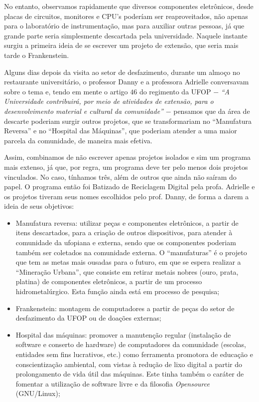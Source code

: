 \documentclass[
	12pt,				%
	openright,			%
	oneside,			%
	a4paper,			%
	english,			%
	spanish,			%
	brazil,				%
	]{abntex2}
\begin{document}
No entanto, observamos rapidamente que diversos componentes eletrônicos, desde placas de circuitos, monitores e CPU's poderíam ser reaproveitados, não apenas para o laboratório de instrumentação, mas para auxiliar outras pessoas, já que grande parte seria simplesmente descartada pela universidade. Naquele instante surgiu a primeira ideia de se escrever um projeto de extensão, que seria mais tarde o Frankenstein.

Alguns dias depois da visita ao setor de desfazimento, durante um almoço no restaurante universitário, o professor Danny e a professora Adrielle conversavam sobre o tema e, tendo em mente o artigo $46$ do regimento da UFOP $-$ \textit{``A Universidade contribuirá, por meio de atividades de extensão, para o desenvolvimento material e cultural da comunidade''} $-$ pensamos que da área de descarte poderiam surgir outros projetos, que se transformariam no ``Manufatura Reversa'' e no ``Hospital das Máquinas'', que poderiam atender a uma maior parcela da comunidade, de maneira mais efetiva.

Assim, combinamos de não escrever apenas projetos isolados e sim um programa mais extenso, já que, por regra, um programa deve ter pelo menos dois projetos vinculados. No caso, tínhamos três, além de outros que ainda não saíram do papel. O programa então foi Batizado de Reciclagem Digital pela profa. Adrielle e  os projetos tiveram seus nomes escolhidos pelo prof. Danny, de forma a darem a ideia de seus objetivos:
\begin{itemize}

	\item Manufatura reversa: utilizar peças e componentes eletrônicos, a partir de itens descartados, para a criação de outros dispositivos, para atender à comunidade da ufopiana e externa, sendo que os componentes poderiam também ser coletados na comunidade externa. O ``manufaturas'' é o projeto que tem as metas mais ousadas para o futuro, em que se espera realizar a ``Mineração Urbana'', que consiste em retirar metais nobres (ouro, prata, platina) de componentes eletrônicos, a partir de um processo hidrometalúrgico. Esta função ainda está em processo de pesquisa;

	\item Frankenstein: montagem de computadores a partir de peças do setor de desfazimento da UFOP ou de doações externas;

	\item Hospital das máquinas: promover a manutenção regular (instalação de software e conserto de hardware) de computadores da comunidade (escolas, entidades sem fins lucrativos, etc.) como ferramenta promotora de educação e conscientização ambiental, com vistas à redução de lixo digital a partir do prolongamento de vida útil das máquinas. Este tinha também o caráter de fomentar a utilização de software livre e da filosofia \textit{Opensource} (GNU/Linux); 

\end{itemize}
\end{document}
